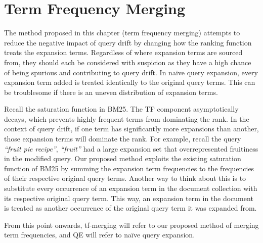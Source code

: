 


\chapter{Term Frequency Merging}  \label{chap:tfm}

The method proposed in this chapter (term frequency merging) attempts to reduce the negative impact of query drift by changing how the ranking function treats the expansion terms. Regardless of where expansion terms are sourced from, they should each be considered with suspicion as they have a high chance of being spurious and contributing to query drift. In na{\"i}ve query expansion, every expansion term added is treated identically to the original query terms. This can be troublesome if there is an uneven distribution of expansion terms.

Recall the saturation function in BM25. The TF component asymptotically decays, which prevents highly frequent terms from dominating the rank. In the context of query drift, if one term has significantly more expansions than another, those expansion terms will dominate the rank. For example, recall the query \textit{``fruit pie recipe''}, \textit{``fruit''} had a large expansion set that overrepresented fruitiness in the modified query. Our proposed method exploits the existing saturation function of BM25 by summing the expansion term frequencies to the frequencies of their respective original query terms. Another way to think about this is to substitute every occurrence of an expansion term in the document collection with its respective original query term. This way, an expansion term in the document is treated as another occurrence of the original query term it was expanded from.



From this point onwards, tf-merging will refer to our proposed method of merging term frequencies, and QE will refer to na{\"i}ve query expansion.







